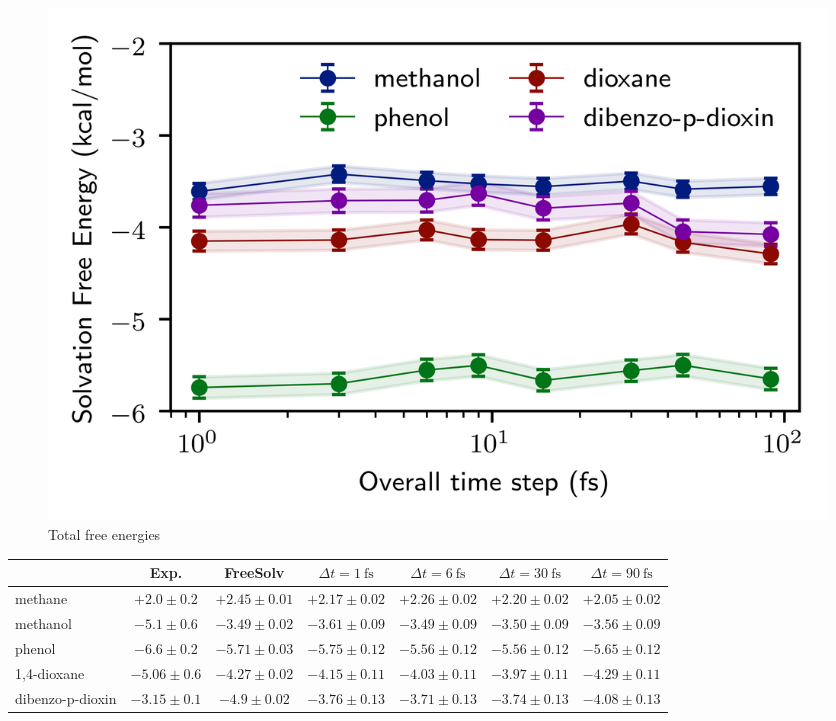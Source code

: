 \documentclass[
aip,
jcp,
reprint,
]{revtex4-1}
\begin{document}
\begin{figure}
	\centering
	\includegraphics{all_molecules_total_free_energies}
	\caption{Total free energies}
	\label{fig:Total free energies of all molecules}
\end{figure}


\begin{table}
	\begin{ruledtabular}
		\begin{tabular}{lcccccc}
			{}                & Exp. & FreeSolv \cite{Mobley_2014_2, Duarte_ramos_matos_2017} & $\Delta t = 1~\mathrm{fs}$  & $\Delta t = 6~\mathrm{fs}$  & $\Delta t = 30~\mathrm{fs}$ & $\Delta t = 90~\mathrm{fs}$ \\
			\hline
            methane & $+2.0 \pm 0.2$ \cite{Abraham_1990} & $+2.45 \pm 0.01$ & $+2.17 \pm 0.02$ & $+2.26 \pm 0.02$ & $+2.20 \pm 0.02$ & $+2.05 \pm 0.02$ \\
			methanol          & $-5.1 \pm 0.6$ \cite{Rizzo_2006}  & $-3.49 \pm 0.02$ & $-3.61 \pm 0.09$ & $-3.49 \pm 0.09$ & $-3.50 \pm 0.09$ & $-3.56 \pm 0.09$ \\
			phenol            & $-6.6 \pm 0.2$ \cite{Abraham_1990} & $-5.71 \pm 0.03$ & $-5.75 \pm 0.12$ & $-5.56 \pm 0.12$ & $-5.56 \pm 0.12$ & $-5.65 \pm 0.12$ \\
			1,4-dioxane       & $-5.06 \pm 0.6$ \cite{Rizzo_2006} & $-4.27 \pm 0.02$ & $-4.15 \pm 0.11$ & $-4.03 \pm 0.11$ & $-3.97 \pm 0.11$ & $-4.29 \pm 0.11$ \\
			dibenzo-p-dioxin  & $-3.15 \pm 0.1$ \cite{Geballe_2012} & $-4.9 \pm 0.02$ & $-3.76 \pm 0.13$ & $-3.71 \pm 0.13$ & $-3.74 \pm 0.13$ & $-4.08 \pm 0.13$ \\
		\end{tabular}
	\end{ruledtabular}
\end{table}
\end{document}

